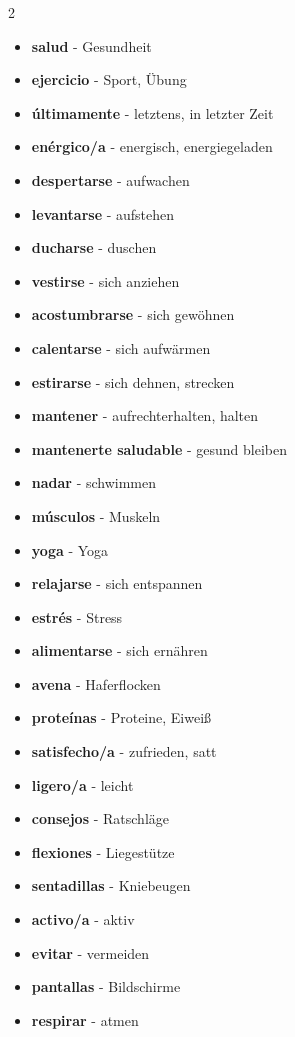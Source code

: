 \documentclass[12pt,a4paper]{article}
\begin{document}
\begin{multicols}{2}
\begin{itemize}[leftmargin=*]
    \item \textbf{salud} - Gesundheit
    \item \textbf{ejercicio} - Sport, Übung
    \item \textbf{últimamente} - letztens, in letzter Zeit
    \item \textbf{enérgico/a} - energisch, energiegeladen
    \item \textbf{despertarse} - aufwachen
    \item \textbf{levantarse} - aufstehen
    \item \textbf{ducharse} - duschen
    \item \textbf{vestirse} - sich anziehen
    \item \textbf{acostumbrarse} - sich gewöhnen
    \item \textbf{calentarse} - sich aufwärmen
    \item \textbf{estirarse} - sich dehnen, strecken
    \item \textbf{mantener} - aufrechterhalten, halten
    \item \textbf{mantenerte saludable} - gesund bleiben
    \item \textbf{nadar} - schwimmen
    \item \textbf{músculos} - Muskeln
    \item \textbf{yoga} - Yoga
    \item \textbf{relajarse} - sich entspannen
    \item \textbf{estrés} - Stress
    \item \textbf{alimentarse} - sich ernähren
    \item \textbf{avena} - Haferflocken
    \item \textbf{proteínas} - Proteine, Eiweiß
    \item \textbf{satisfecho/a} - zufrieden, satt
    \item \textbf{ligero/a} - leicht
    \item \textbf{consejos} - Ratschläge
    \item \textbf{flexiones} - Liegestütze
    \item \textbf{sentadillas} - Kniebeugen
    \item \textbf{activo/a} - aktiv
    \item \textbf{evitar} - vermeiden
    \item \textbf{pantallas} - Bildschirme
    \item \textbf{respirar} - atmen

\end{itemize}
\end{multicols}
\end{document}

